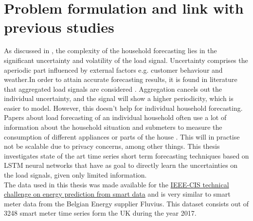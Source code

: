 \section{Problem formulation and link with previous studies}
As discussed in \cite{Shi2018}, the complexity of the household forecasting lies in the significant uncertainty and volatility of the load signal. Uncertainty comprises the aperiodic part influenced by external factors e.g. customer behaviour and weather.In order to attain accurate forecasting results, it is found in literature that aggregated load signals are considered \cite{loadforecastingmoor}. Aggregation cancels out the individual uncertainty, and the signal will show a higher periodicity, which is easier to model. However, this doesn't help for individual household forecasting. Papers about load forecasting of an individual household often use a lot of information about the household situation and submeters to measure the consumption of different appliances or parts of the house \cite{Kim2019}. This will in practise not be scalable due to privacy concerns, among other things. This thesis investigates state of the art time series short term forecasting techniques based on LSTM neural networks that have as goal to directly learn the uncertainties on the load signals, given only limited information.\\


The data used in this thesis was made available for the \href{https://ieee-dataport.org/competitions/ieee-cis-technical-challenge-energy-prediction-smart-meter-data}{IEEE-CIS technical challenge on energy prediction from smart data} and is very similar to smart meter data from the Belgian Energy supplier Fluvius.
This dataset consists out of 3248 smart meter time series form the UK during the year 2017. 


